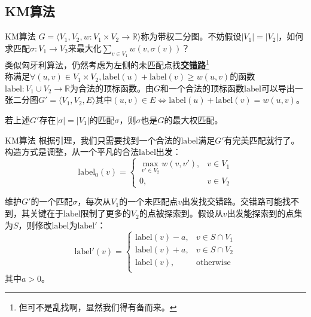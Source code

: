 \documentclass{beamer}
\def\obj#1{\textbf{\uline{#1}}}
\def\ge{\geqslant}
\begin{document}
\subsection{KM算法}
\begin{frame}{KM算法}
	$G = \langle V_1, V_2, w: V_1 \times V_2 \to \mathbb R \rangle$称为带权二分图。不妨假设$|V_1| = |V_2|$，如何求匹配$\sigma: V_1 \to V_2$来最大化$\sum_{v \in V_1}w(v, \sigma(v))$？\\

	类似匈牙利算法，仍然考虑为左侧的未匹配点找\obj{交错路}\footnote{\tiny 但可不是乱找啊，显然我们得有备而来。}\pause\\

	称满足$\forall (u, v) \in V_1 \times V_2, \mathrm{label}(u) + \mathrm{label}(v) \ge w(u, v)$的函数$\mathrm{label}: V_1 \cup V_2 \to \mathbb R$为合法的顶标函数。由$G$和一个合法的顶标函数$\mathrm{label}$可以导出一张二分图$G' = \langle V_1, V_2, E \rangle$其中$(u, v) \in E \Leftrightarrow \mathrm{label}(u) + \mathrm{label}(v) = w(u, v)$。

	\begin{lemma}
		若上述$G'$存在$|\sigma| = |V_1|$的匹配$\sigma$，则$\sigma$也是$G$的最大权匹配。
	\end{lemma}
\end{frame}
\begin{frame}{KM算法}
	根据引理，我们只需要找到一个合法的$\mathrm{label}$满足$G'$有完美匹配就行了。构造方式是调整，从一个平凡的合法$\mathrm{label}$出发：$$\mathrm{label}_0(v) = \begin{cases}
		\max_{v' \in V_2}w(v, v'), & v \in V_1\\
		0, & v \in V_2
	\end{cases}$$

	维护$G'$的一个匹配$\sigma$，每次从$V_1$的一个未匹配点$v$出发找交错路。交错路可能找不到，其关键在于$\mathrm{label}$限制了更多的$V_2$的点被探索到。假设从$v$出发能探索到的点集为$S$，则修改$\mathrm{label}$为$\mathrm{label}'$：
	$$\mathrm{label}'(v) = \begin{cases}
		\mathrm{label}(v) - a, & v \in S \cap V_1\\
		\mathrm{label}(v) + a, & v \in S \cap V_2\\
		\mathrm{label}(v), & \textrm{otherwise}\\
	\end{cases}$$
	其中$a > 0$。
\end{frame}
\end{document}
